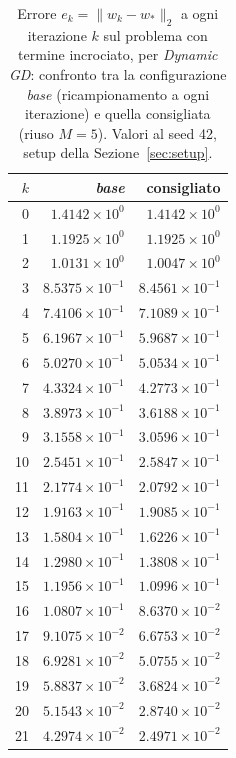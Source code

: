 \begin{table}[H]
\centering
\footnotesize
\renewcommand{\arraystretch}{0.85}
\setlength{\tabcolsep}{8pt}
\caption{Errore $e_k=\|w_k-w_*\|_2$ a ogni iterazione $k$ sul problema con termine incrociato, per \emph{Dynamic GD}: confronto tra la configurazione \emph{base} (ricampionamento a ogni iterazione) e quella consigliata (riuso $M{=}5$). Valori al seed 42, setup della Sezione~\ref{sec:setup}.}
\label{tab:riuso_cons_offdiag_gd}
\begin{tabular}{@{}rrr@{}}
\toprule
$k$ & \emph{base} & consigliato\\
\midrule
0 & $1.4142\times10^{0}$ & $1.4142\times10^{0}$\\
1 & $1.1925\times10^{0}$ & $1.1925\times10^{0}$\\
2 & $1.0131\times10^{0}$ & $1.0047\times10^{0}$\\
3 & $8.5375\times10^{-1}$ & $8.4561\times10^{-1}$\\
4 & $7.4106\times10^{-1}$ & $7.1089\times10^{-1}$\\
5 & $6.1967\times10^{-1}$ & $5.9687\times10^{-1}$\\
6 & $5.0270\times10^{-1}$ & $5.0534\times10^{-1}$\\
7 & $4.3324\times10^{-1}$ & $4.2773\times10^{-1}$\\
8 & $3.8973\times10^{-1}$ & $3.6188\times10^{-1}$\\
9 & $3.1558\times10^{-1}$ & $3.0596\times10^{-1}$\\
10 & $2.5451\times10^{-1}$ & $2.5847\times10^{-1}$\\
11 & $2.1774\times10^{-1}$ & $2.0792\times10^{-1}$\\
12 & $1.9163\times10^{-1}$ & $1.9085\times10^{-1}$\\
13 & $1.5804\times10^{-1}$ & $1.6226\times10^{-1}$\\
14 & $1.2980\times10^{-1}$ & $1.3808\times10^{-1}$\\
15 & $1.1956\times10^{-1}$ & $1.0996\times10^{-1}$\\
16 & $1.0807\times10^{-1}$ & $8.6370\times10^{-2}$\\
17 & $9.1075\times10^{-2}$ & $6.6753\times10^{-2}$\\
18 & $6.9281\times10^{-2}$ & $5.0755\times10^{-2}$\\
19 & $5.8837\times10^{-2}$ & $3.6824\times10^{-2}$\\
20 & $5.1543\times10^{-2}$ & $2.8740\times10^{-2}$\\
21 & $4.2974\times10^{-2}$ & $2.4971\times10^{-2}$\\

\end{tabular}
\end{table}
